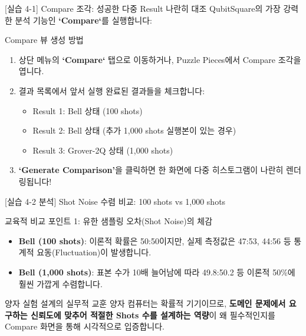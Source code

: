 \documentclass[aspectratio=169, 10pt]{beamer}
\begin{document}
\begin{frame}{[실습 4-1] Compare 조각: 성공한 다중 Result 나란히 대조}
    QubitSquare의 가장 강력한 분석 기능인 \textbf{`Compare`}를 실행합니다:
    \vspace{0.2cm}
    \begin{qcblock}{Compare 뷰 생성 방법}
        \begin{enumerate}
            \item 상단 메뉴의 \textbf{`Compare`} 탭으로 이동하거나, Puzzle Pieces에서 Compare 조각을 엽니다.
            \pause
            \item 결과 목록에서 앞서 실행 완료된 결과들을 체크합니다:
            \begin{itemize}
                \item Result 1: Bell 상태 (100 shots)
                \pause
                \item Result 2: Bell 상태 (추가 1,000 shots 실행본이 있는 경우)
                \pause
                \item Result 3: Grover-2Q 상태 (1,000 shots)
            \end{itemize}
            \pause
            \item \textbf{‘Generate Comparison’}을 클릭하면 한 화면에 다중 히스토그램이 나란히 렌더링됩니다!
        \end{enumerate}
    \end{qcblock}
\end{frame}

\begin{frame}{[실습 4-2 분석] Shot Noise 수렴 비교: 100 shots vs 1,000 shots}
    \begin{qcblock}{교육적 비교 포인트 1: 유한 샘플링 오차(Shot Noise)의 체감}
        \begin{itemize}
            \item \textbf{Bell (100 shots)}:
            이론적 확률은 50:50이지만, 실제 측정값은 47:53, 44:56 등 통계적 요동(Fluctuation)이 발생합니다.
            \pause
            \item \textbf{Bell (1,000 shots)}:
            표본 수가 10배 늘어남에 따라 49.8:50.2 등 이론적 50\%에 훨씬 가깝게 수렴합니다.
        \end{itemize}
    \end{qcblock}
    \vspace{0.3cm}
    \begin{qctip}{양자 실험 설계의 실무적 교훈}
        양자 컴퓨터는 확률적 기기이므로, \textbf{도메인 문제에서 요구하는 신뢰도에 맞추어 적절한 Shots 수를 설계하는 역량}이 왜 필수적인지를 Compare 화면을 통해 시각적으로 입증합니다.
    \end{qctip}
\end{frame}
\end{document}
